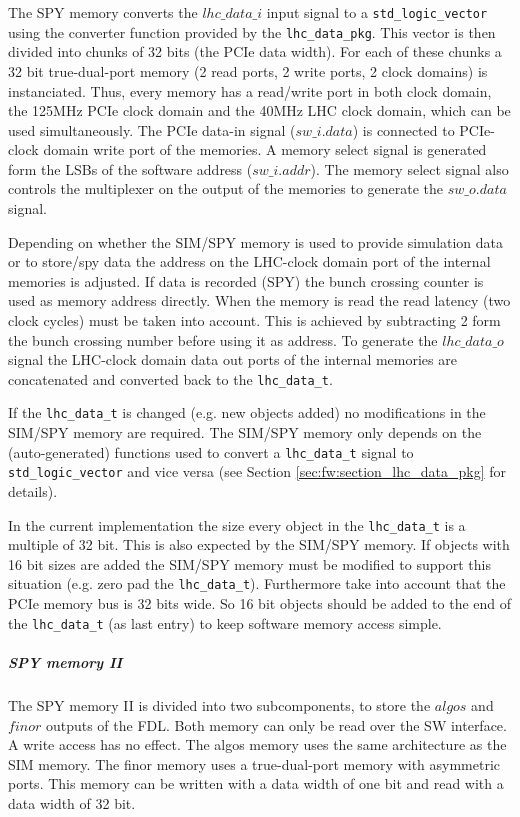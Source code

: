 The SPY memory converts the $lhc\_data\_i$ input signal to a \texttt{std\_logic\_vector} using the converter function provided by the \texttt{lhc\_data\_pkg}. This vector
is then divided into chunks of 32 bits (the PCIe data width). For each of these chunks a 32 bit true-dual-port memory (2 read ports, 2 write ports, 2 clock domains) is instanciated.
Thus, every memory has a read/write port in both clock domain, the 125MHz PCIe clock domain and the 40MHz LHC clock domain, which can be used simultaneously.
The PCIe data-in signal ($sw\_i.data$) is connected to PCIe-clock domain write port of the memories. A memory select signal is generated form the LSBs of the software address ($sw\_i.addr$).
The memory select signal also controls the multiplexer on the output of the memories to generate the $sw\_o.data$ signal.

Depending on whether the SIM/SPY memory is used to provide simulation data or to store/spy data the address on the LHC-clock domain port of the internal memories is adjusted.
If data is recorded (SPY) the bunch crossing counter is used as memory address directly.
When the memory is read the read latency (two clock cycles) must be taken into account.
This is achieved by subtracting 2 form the bunch crossing number before using it as address.
To generate the $lhc\_data\_o$ signal the LHC-clock domain data out ports of the internal memories are concatenated and converted back to the \texttt{lhc\_data\_t}.

If the \texttt{lhc\_data\_t} is changed (e.g. new objects added) no modifications in the SIM/SPY memory are required. The SIM/SPY memory only depends on the (auto-generated)
functions used to convert a \texttt{lhc\_data\_t} signal to \texttt{std\_logic\_vector} and vice versa (see Section \ref{sec:fw:section_lhc_data_pkg} for details).

In the current implementation the size every object in the \texttt{lhc\_data\_t} is a multiple of 32 bit. This is also expected by the SIM/SPY memory. If objects with 16 bit sizes
are added the SIM/SPY memory must be modified to support this situation (e.g. zero pad the \texttt{lhc\_data\_t}). Furthermore take into account that the PCIe memory bus is 32 bits wide.
So 16 bit objects should be added to the end of the \texttt{lhc\_data\_t} (as last entry) to keep software memory access simple.

\subparagraph{SPY memory II}
The SPY memory II is divided into two subcomponents, to store the $algos$ and $finor$ outputs of the FDL.
Both memory can only be read over the SW interface. A write access has no effect.
The algos memory uses the same architecture as the SIM memory.
The finor memory uses a true-dual-port memory with asymmetric ports. This memory can be written with a data width of one bit and read with a data width of 32 bit.

